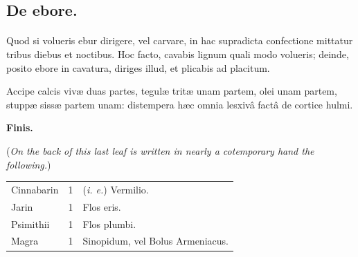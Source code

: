 \documentclass[a4paper, 11pt, oneside, polutonikogreek, italian]{article}
\begin{document}
\subsection{De ebore.}
\paragraph{}
Quod si volueris ebur dirigere, vel carvare, in hac supradicta confectione mittatur tribus diebus et noctibus. Hoc facto, cavabis lignum quali modo volueris; deinde, posito ebore in cavatura, diriges illud, et plicabis ad placitum.

Accipe calcis vivæ duas partes, tegulæ tritæ unam partem, olei unam partem, stuppæ sissæ partem unam: distempera hæc omnia lesxivâ factâ de cortice hulmi.
\begin{center}
\textbf{Finis.}
\clearpage
\end{center}
\begin{center}
(\emph{On the back of this last leaf is written in nearly a cotemporary hand the following.})
\end{center}
\begin{table}[H]
    \centering\bfseries\small
    \begin{tabular}{l l l}
        Cinnabarin  & 1 &  (\emph{i. e.}) Vermilio.                 \\
         Jarin       & 1 &  Flos eris.                        \\
         Psimithii   & 1 &  Flos plumbi.                      \\
         Magra       & 1 &  Sinopidum, vel Bolus Armeniacus. \\
    \end{tabular}
\end{table}
\end{document}

